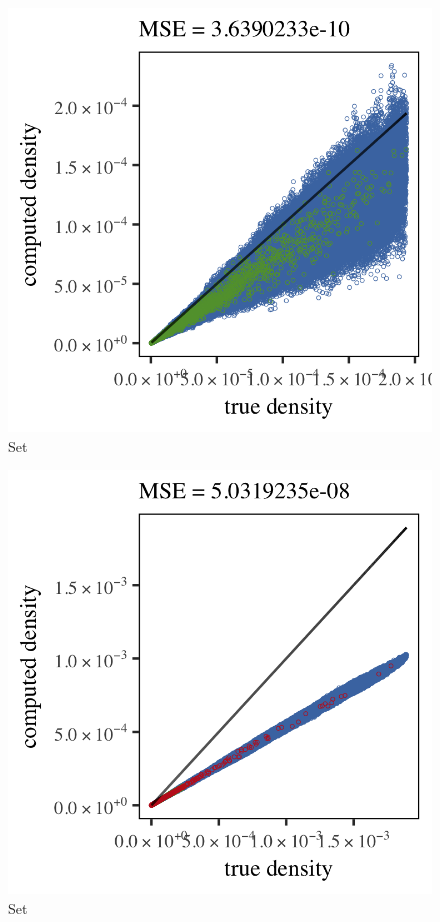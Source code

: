 
\begin{subfigure}{0.3\textwidth}
	\centering
	\includegraphics[keepaspectratio=true, width=\textwidth, height=0.23\textheight]{4/img/results_ferdosi_1_600000_mbe_silverman}
	\caption{Set \ferdosiOne}
	\label{fig:4:simulated:datasets:mbe:ferdosi1}
\end{subfigure}
\begin{subfigure}{0.3\textwidth}
	\centering
	\includegraphics[keepaspectratio=true, width=\textwidth, height=0.23\textheight]{4/img/results_ferdosi_2_600000_mbe_silverman}
	\caption{Set \ferdosiTwo}
	\label{fig:4:simulated:datasets:mbe:ferdosi2}
\end{subfigure}	
